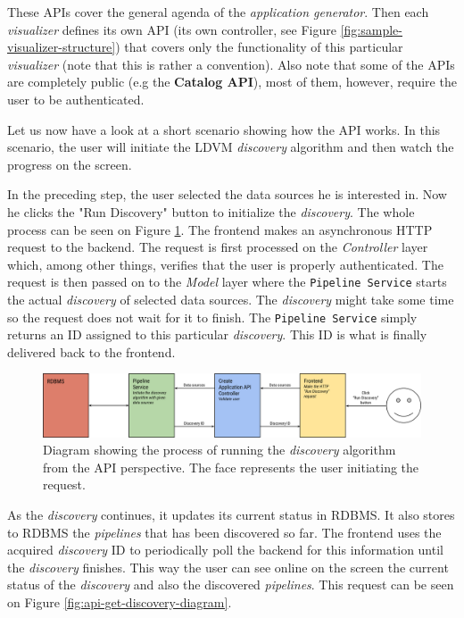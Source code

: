 These APIs cover the general agenda of the \emph{application generator}. Then each \emph{visualizer} defines its own API (its own controller, see Figure \ref{fig:sample-visualizer-structure}) that covers only the functionality of this particular \emph{visualizer} (note that this is rather a convention). Also note that some of the APIs are completely public (e.g the \textbf{Catalog API}), most of them, however, require the user to be authenticated.

Let us now  have a look at a short scenario showing how the API works. In this scenario, the user will initiate the LDVM \emph{discovery} algorithm and then watch the progress on the screen.

In the preceding step, the user selected the data sources he is interested in. Now he clicks the "Run Discovery" button to initialize the \emph{discovery}. The whole process can be seen on Figure \ref{fig:api-run-discovery-diagram}. The frontend makes an asynchronous HTTP request to the backend. The request is first processed on the \emph{Controller} layer which, among other things, verifies that the user is properly authenticated. The request is then passed on to the \emph{Model} layer where the \texttt{Pipeline Service} starts the actual \emph{discovery} of selected data sources. The \emph{discovery} might take some time so the request does not wait for it to finish. The \texttt{Pipeline Service} simply returns an ID assigned to this particular \emph{discovery}. This ID is what is finally delivered back to the frontend.

\begin{figure}
	\centering
	\includegraphics[width=140mm]{img/04_api_run_discovery_diagram.png}
	\caption{Diagram showing the process of running the \emph{discovery} algorithm from the API perspective. The face represents the user initiating the request.} 
	\label{fig:api-run-discovery-diagram}
\end{figure}

As the \emph{discovery} continues, it updates its current status in RDBMS. It also stores to RDBMS the \emph{pipelines} that has been discovered so far. The frontend uses the acquired \emph{discovery} ID to periodically poll the backend for this information until the \emph{discovery} finishes. This way the user can see online on the screen the current status of the \emph{discovery} and also the discovered \emph{pipelines}. This request can be seen on Figure \ref{fig:api-get-discovery-diagram}.

